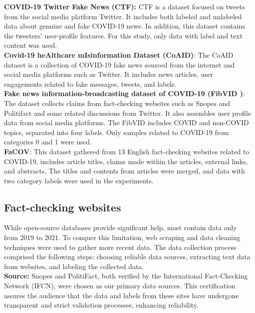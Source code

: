\textbf{COVID-19 Twitter Fake News (CTF)\cite{b6}:}
CTF is a dataset focused on tweets from the social media platform Twitter. It includes both labeled and unlabeled data about genuine and fake COVID-19 news. In addition, this dataset contains the tweeters' user-profile features. For this study, only data with label and text content was used.\\

\textbf{Covid-19 heAlthcare mIsinformation Dataset (CoAID)\cite{b10}}:
The CoAID dataset is a collection of COVID-19 fake news sourced from the internet and social media platforms such as Twitter. It includes news articles, user engagements related to fake messages, tweets, and labels.\\


\textbf{Fake news information-broadcasting dataset of COVID-19 (FibVID )\cite{b11}}:
The dataset collects claims from fact-checking websites such as Snopes and Politifact and some related discussions from Twitter. It also assembles user profile data from social media platforms. The FibVID includes COVID and non-COVID topics, separated into four labels. Only samples related to COVID-19 from categories 0 and 1 were used.\\

\textbf{FaCOV\cite{b12}}:
This dataset gathered from 13 English fact-checking websites related to COVID-19, includes article titles, claims made within the articles, external links, and abstracts. The titles and contents from articles were merged, and data with two category labels were used in the experiments.

\subsection{Fact-checking websites}
While open-source databases provide significant help, most contain data only from 2019 to 2021. To conquer this limitation, web scraping and data cleaning techniques were used to gather more recent data. The data collection process comprised the following steps: choosing reliable data sources, extracting text data from websites, and labeling the collected data.\\

\textbf{Source:}
Snopes\cite{b13} and PolitiFact\cite{b14}, both verified by the International Fact-Checking Network (IFCN), were chosen as our primary data sources. This certification assures the audience that the data and labels from these sites have undergone transparent and strict validation processes, enhancing reliability.\\

